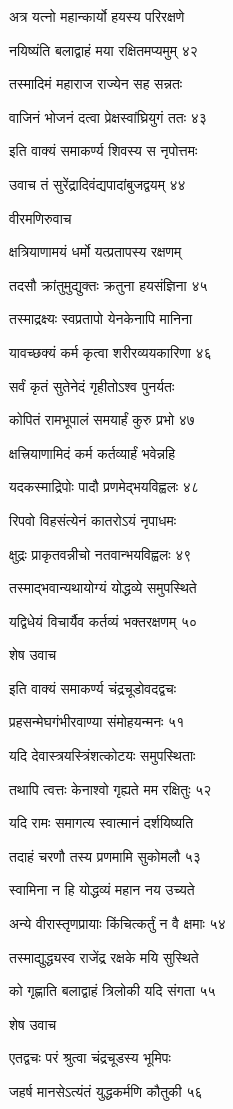 अत्र यत्नो महान्कार्यो हयस्य परिरक्षणे

नयिष्यंति बलाद्वाहं मया रक्षितमप्यमुम् ४२

तस्मादिमं महाराज राज्येन सह सन्नतः

वाजिनं भोजनं दत्वा प्रेक्षस्वांघ्रियुगं ततः ४३

इति वाक्यं समाकर्ण्य शिवस्य स नृपोत्तमः

उवाच तं सुरेंद्रादिवंद्यपादांबुजद्वयम् ४४

वीरमणिरुवाच

क्षत्रियाणामयं धर्मो यत्प्रतापस्य रक्षणम्

तदसौ क्रांतुमुद्युक्तः क्रतुना हयसंज्ञिना ४५

तस्माद्रक्ष्यः स्वप्रतापो येनकेनापि मानिना

यावच्छक्यं कर्म कृत्वा शरीरव्ययकारिणा ४६

सर्वं कृतं सुतेनेदं गृहीतोऽश्व पुनर्यतः

कोपितं रामभूपालं समयार्हं कुरु प्रभो ४७

क्षत्त्रियाणामिदं कर्म कर्तव्यार्हं भवेन्नहि

यदकस्माद्रिपोः पादौ प्रणमेद्भयविह्वलः ४८

रिपवो विहसंत्येनं कातरोऽयं नृपाधमः

क्षुद्रः प्राकृतवन्नीचो नतवान्भयविह्वलः ४९

तस्माद्भवान्यथायोग्यं योद्धव्ये समुपस्थिते

यद्विधेयं विचार्यैव कर्तव्यं भक्तरक्षणम् ५०

शेष उवाच

इति वाक्यं समाकर्ण्य चंद्रचूडोवदद्वचः

प्रहसन्मेघगंभीरवाण्या संमोहयन्मनः ५१

यदि देवास्त्रयस्त्रिंशत्कोटयः समुपस्थिताः

तथापि त्वत्तः केनाश्वो गृह्यते मम रक्षितुः ५२

यदि रामः समागत्य स्वात्मानं दर्शयिष्यति

तदाहं चरणौ तस्य प्रणमामि सुकोमलौ ५३

स्वामिना न हि योद्धव्यं महान नय उच्यते

अन्ये वीरास्तृणप्रायाः किंचित्कर्तुं न वै क्षमाः ५४

तस्माद्युद्ध्यस्व राजेंद्र रक्षके मयि सुस्थिते

को गृह्णाति बलाद्वाहं त्रिलोकी यदि संगता ५५

शेष उवाच

एतद्वचः परं श्रुत्वा चंद्रचूडस्य भूमिपः

जहर्ष मानसेऽत्यंतं युद्धकर्मणि कौतुकी ५६

